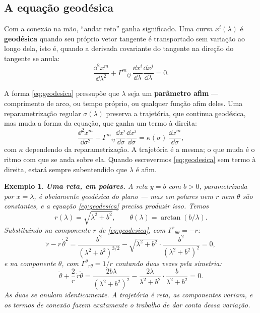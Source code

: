 \documentclass[12pt,a4paper,oneside]{book}
\theoremstyle{rgplain}
\newtheorem{example}{Exemplo}[chapter]
\theoremstyle{rgremark}
\begin{document}
\subsection*{A equação geodésica}

Com a conexão na mão, ``andar reto'' ganha significado. Uma curva
$x^i(\lambda)$ é \textbf{geodésica} quando seu próprio vetor tangente é
transportado sem variação ao longo dela, isto é, quando a derivada covariante
do tangente na direção do tangente se anula:
\begin{equation}
  \frac{\dd^2x^m}{\dd\lambda^2}
  +\Gamma^m{}_{ij}\,\frac{\dd x^i}{\dd\lambda}\frac{\dd x^j}{\dd\lambda}=0 .
  \label{eq:geodesica}
\end{equation}

\begin{atencao}[title={\sffamily\bfseries\footnotesize\color{rgTerracota}O PARÂMETRO NÃO É QUALQUER UM}]
A forma \eqref{eq:geodesica} pressupõe que $\lambda$ seja um \textbf{parâmetro
afim} --- comprimento de arco, ou tempo próprio, ou qualquer função afim
deles. Uma reparametrização regular $\sigma(\lambda)$ preserva a trajetória, que
continua geodésica, mas muda a forma da equação, que ganha um termo à
direita:
\[
  \frac{\dd^2x^m}{\dd\sigma^2}
  +\Gamma^m{}_{ij}\frac{\dd x^i}{\dd\sigma}\frac{\dd x^j}{\dd\sigma}
  =\kappa(\sigma)\,\frac{\dd x^m}{\dd\sigma} ,
\]
com $\kappa$ dependendo da reparametrização. A trajetória é a mesma; o que
muda é o ritmo com que se anda sobre ela. Quando escrevermos
\eqref{eq:geodesica} sem termo à direita, estará sempre subentendido que
$\lambda$ é afim.
\end{atencao}

\begin{example}
\textbf{Uma reta, em polares.} A reta $y=b$ com $b>0$, parametrizada por
$x=\lambda$, é obviamente geodésica do plano --- mas em polares nem $r$ nem
$\theta$ são constantes, e a equação \eqref{eq:geodesica} precisa produzir
isso. Temos
\[
  r(\lambda)=\sqrt{\lambda^2+b^2},
  \qquad
  \theta(\lambda)=\arctan(b/\lambda) .
\]
Substituindo na componente $r$ de \eqref{eq:geodesica}, com
$\Gamma^r{}_{\theta\theta}=-r$:
\[
  \ddot r-r\,\dot\theta^2
  =\frac{b^2}{(\lambda^2+b^2)^{3/2}}
   -\sqrt{\lambda^2+b^2}\cdot\frac{b^2}{(\lambda^2+b^2)^2}=0 ,
\]
e na componente $\theta$, com $\Gamma^\theta{}_{r\theta}=1/r$ contando duas
vezes pela simetria:
\[
  \ddot\theta+\frac2r\,\dot r\dot\theta
  =\frac{2b\lambda}{(\lambda^2+b^2)^2}
   -\frac{2\lambda}{\lambda^2+b^2}\cdot\frac{b}{\lambda^2+b^2}=0 .
\]
As duas se anulam identicamente. A trajetória é reta, as componentes variam, e
os termos de conexão fazem exatamente o trabalho de dar conta dessa variação.
\end{example}
\end{document}
